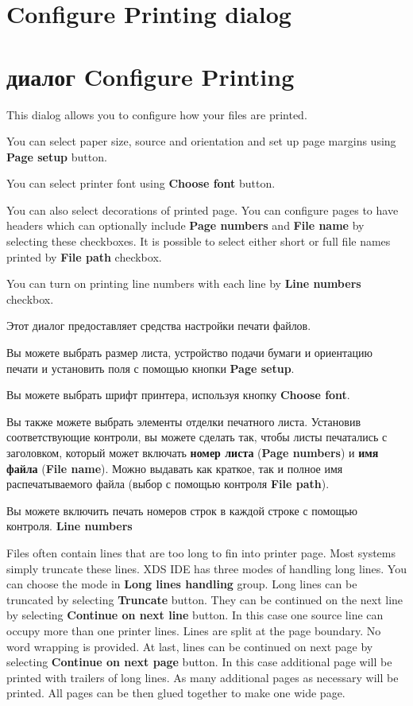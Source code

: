 \ifenglish
\section {Configure Printing dialog}
\else
\section {диалог Configure Printing}
\fi
{}
\nominitoc

\ifenglish
This dialog allows you to configure how your files are printed.

You can select paper size, source and orientation and set up page margins
using {\bf Page setup} button.

You can select printer font using {\bf Choose font} button.

You can also select decorations of printed page. You can configure pages to
have headers which can optionally include {\bf Page numbers} and {\bf File name}
by selecting these checkboxes. It is possible to select either short or full
file names printed by {\bf File path} checkbox.

You can turn on printing line numbers with each line by {\bf Line numbers}
checkbox.

\else
Этот диалог предоставляет средства настройки печати файлов.  

Вы можете выбрать размер листа, устройство подачи бумаги и ориентацию печати 
и установить поля с помощью кнопки {\bf Page setup}.

Вы можете выбрать шрифт принтера, используя кнопку {\bf Choose font}.

Вы также можете выбрать элементы отделки печатного листа. Установив 
соответствующие контроли, вы можете сделать так, чтобы листы печатались с 
заголовком, который может включать {\bf номер листа} ({\bf Page numbers}) 
и {\bf имя файла} ({\bf File name}). Можно выдавать как краткое, так и полное 
имя распечатываемого файла (выбор с помощью контроля {\bf File path}).

Вы можете включить печать номеров строк в каждой строке с помощью контроля.
\fi
{\bf Line numbers}

\ifenglish
Files often contain lines that are too long to fin into printer page. Most
systems simply truncate these lines. XDS IDE has three modes of handling long
lines. You can choose the mode in {\bf Long lines handling} group.
Long lines can be truncated by selecting {\bf Truncate} button.
They can be continued on the next line by selecting {\bf Continue on next line}
button. In this case one source line can occupy more than one printer lines.
Lines are split at the page boundary. No word wrapping is provided.
At last, lines can be continued on next page by selecting {\bf Continue on next page}
button. In this case additional page will be printed with trailers of long lines.
As many additional pages as necessary will be printed. All pages can be then glued
together to make one wide page.

